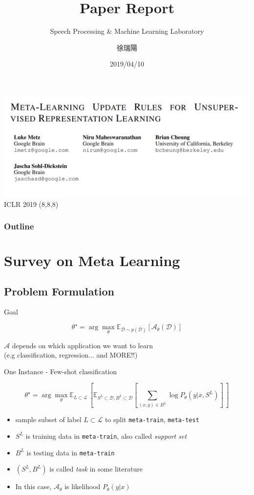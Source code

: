 \documentclass{beamer}
\title{Paper Report}
\subtitle{\textcolor[rgb]{0.00,0.50,1.00}{{Speech Processing \& Machine Learning Laboratory}}}
\author{徐瑞陽}
\date{2019/04/10}
\begin{document}
\begin{frame}
\maketitle
\end{frame}

\begin{frame}
  \includegraphics[width=\textwidth]{fig/title.png}
  \center ICLR 2019
  \center (8,8,8)
\end{frame}


\begin{frame}
\frametitle{Outline}
\tableofcontents
\end{frame}

\section{Survey on Meta Learning}
\subsection{Problem Formulation}
\begin{frame}{Goal}

\[ \theta^\star = \arg \max_\theta \mathbb{E}_{\mathcal{D} \sim p(\mathcal{D}) }[\mathcal{A}_\theta(\mathcal{D})]\]

$\mathcal{A}$ depends on which application we want to learn \\ 
(e.g classification, regression... and MORE!!)
\end{frame}

\begin{frame}{One Instance - Few-shot classification}

  \[ \theta^\star = \arg \max_\theta \mathbb{E}_{L \subset \mathcal{L}} \, [ \mathbb{E}_{S^L \subset \mathcal{D}, B^L \subset \mathcal{D}}[\sum_{(x,y) \in B^L} \log P_\theta(y|x,S^L)] \,  ]\]

  \begin{itemize}
    \item sample subset of label $L \subset \mathcal{L}$ to split \texttt{meta-train}, \texttt{meta-test}
    \item $S^L$ is training data in \texttt{meta-train}, also called \textit{support set}
    \item $B^L$ is testing data in \texttt{meta-train}
    \item $(S^L, B^L)$ is called \textit{task} in some literature
    \item In this case, $\mathcal{A}_\theta$ is likelihood $P_\theta(y|x)$
  \end{itemize}
\end{frame}
\end{document}
